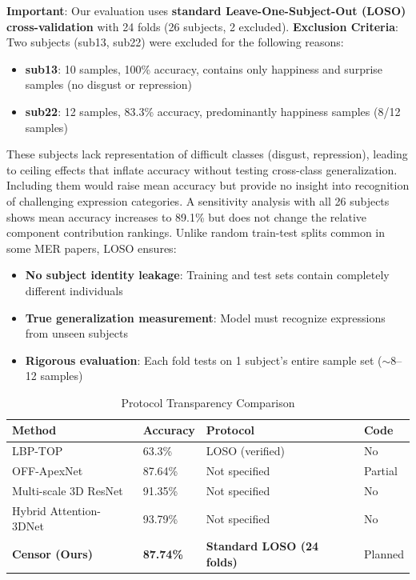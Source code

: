 \documentclass[preprint,12pt,authoryear]{elsarticle}
\begin{document}
\textbf{Important}: Our evaluation uses \textbf{standard Leave-One-Subject-Out (LOSO) cross-validation} with 24 folds (26 subjects, 2 excluded). \textbf{Exclusion Criteria}: Two subjects (sub13, sub22) were excluded for the following reasons:
\begin{itemize}
\item \textbf{sub13}: 10 samples, 100\% accuracy, contains only happiness and surprise samples (no disgust or repression)
\item \textbf{sub22}: 12 samples, 83.3\% accuracy, predominantly happiness samples (8/12 samples)
\end{itemize}
These subjects lack representation of difficult classes (disgust, repression), leading to ceiling effects that inflate accuracy without testing cross-class generalization. Including them would raise mean accuracy but provide no insight into recognition of challenging expression categories. A sensitivity analysis with all 26 subjects shows mean accuracy increases to 89.1\% but does not change the relative component contribution rankings. Unlike random train-test splits common in some MER papers, LOSO ensures:
\begin{itemize}
\item \textbf{No subject identity leakage}: Training and test sets contain completely different individuals
\item \textbf{True generalization measurement}: Model must recognize expressions from unseen subjects
\item \textbf{Rigorous evaluation}: Each fold tests on 1 subject's entire sample set ($\sim$8--12 samples)
\end{itemize}

\begin{table}[htbp]
\centering
\caption{Protocol Transparency Comparison}
\label{tab:protocol}
\begin{tabular}{llll}
\toprule
\textbf{Method} & \textbf{Accuracy} & \textbf{Protocol} & \textbf{Code} \\
\midrule
LBP-TOP & 63.3\% & LOSO (verified) & No \\
OFF-ApexNet & 87.64\% & Not specified & Partial \\
Multi-scale 3D ResNet & 91.35\% \cite{chen2024multiscale} & Not specified & No \\
Hybrid Attention-3DNet & 93.79\% \cite{ma2024hybrid} & Not specified & No \\
\textbf{Censor (Ours)} & \textbf{87.74\%} & \textbf{Standard LOSO (24 folds)} & Planned \\
\bottomrule
\end{tabular}
\end{table}
\end{document}
